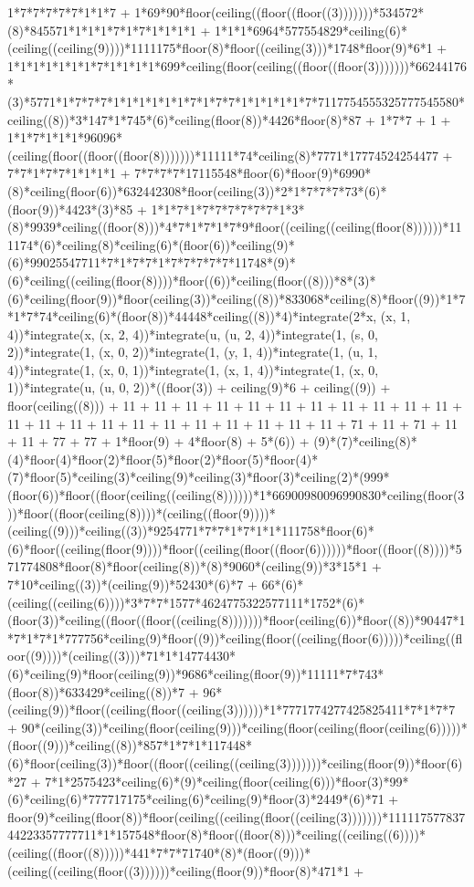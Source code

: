 1*7*7*7*7*7*1*1*7 + 1*69*90*floor(ceiling((floor((floor((3)))))))*534572*(8)*845571*1*1*1*7*1*7*1*1*1*1 + 1*1*1*6964*577554829*ceiling(6)*(ceiling((ceiling(9))))*1111175*floor(8)*floor((ceiling(3)))*1748*floor(9)*6*1 + 1*1*1*1*1*1*1*7*1*1*1*1*699*ceiling(floor(ceiling((floor((floor(3)))))))*66244176*(3)*5771*1*7*7*7*1*1*1*1*1*1*7*1*7*7*1*1*1*1*1*7*7117754555325777545580*ceiling((8))*3*147*1*745*(6)*ceiling(floor(8))*4426*floor(8)*87 + 1*7*7 + 1 + 1*1*7*1*1*1*96096*(ceiling(floor((floor((floor(8)))))))*11111*74*ceiling(8)*7771*17774524254477 + 7*7*1*7*7*1*1*1*1 + 7*7*7*7*17115548*floor(6)*floor(9)*6990*(8)*ceiling(floor(6))*632442308*floor(ceiling(3))*2*1*7*7*7*73*(6)*(floor(9))*4423*(3)*85 + 1*1*7*1*7*7*7*7*7*7*1*3*(8)*9939*ceiling((floor(8)))*4*7*1*7*1*7*9*floor((ceiling((ceiling(floor(8))))))*111174*(6)*ceiling(8)*ceiling(6)*(floor(6))*ceiling(9)*(6)*99025547711*7*1*7*7*1*7*7*7*7*7*11748*(9)*(6)*ceiling((ceiling(floor(8))))*floor((6))*ceiling(floor((8)))*8*(3)*(6)*ceiling(floor(9))*floor(ceiling(3))*ceiling((8))*833068*ceiling(8)*floor((9))*1*7*1*7*74*ceiling(6)*(floor(8))*44448*ceiling((8))*4)*integrate(2*x, (x, 1, 4))*integrate(x, (x, 2, 4))*integrate(u, (u, 2, 4))*integrate(1, (s, 0, 2))*integrate(1, (x, 0, 2))*integrate(1, (y, 1, 4))*integrate(1, (u, 1, 4))*integrate(1, (x, 0, 1))*integrate(1, (x, 1, 4))*integrate(1, (x, 0, 1))*integrate(u, (u, 0, 2))*((floor(3)) + ceiling(9)*6 + ceiling((9)) + floor(ceiling((8))) + 11 + 11 + 11 + 11 + 11 + 11 + 11 + 11 + 11 + 11 + 11 + 11 + 11 + 11 + 11 + 11 + 11 + 11 + 11 + 11 + 11 + 11 + 71 + 11 + 71 + 11 + 11 + 77 + 77 + 1*floor(9) + 4*floor(8) + 5*(6)) + (9)*(7)*ceiling(8)*(4)*floor(4)*floor(2)*floor(5)*floor(2)*floor(5)*floor(4)*(7)*floor(5)*ceiling(3)*ceiling(9)*ceiling(3)*floor(3)*ceiling(2)*(999*(floor(6))*floor((floor(ceiling((ceiling(8))))))*1*66900980096990830*ceiling(floor(3))*floor((floor(ceiling(8))))*(ceiling((floor(9))))*(ceiling((9)))*ceiling((3))*9254771*7*7*1*7*1*1*111758*floor(6)*(6)*floor((ceiling(floor(9))))*floor((ceiling(floor((floor(6))))))*floor((floor((8))))*571774808*floor(8)*floor(ceiling(8))*(8)*9060*(ceiling(9))*3*15*1 + 7*10*ceiling((3))*(ceiling(9))*52430*(6)*7 + 66*(6)*(ceiling((ceiling(6))))*3*7*7*1577*4624775322577111*1752*(6)*(floor(3))*ceiling((floor((floor((ceiling(8)))))))*floor(ceiling(6))*floor((8))*90447*1*7*1*7*1*777756*ceiling(9)*floor((9))*ceiling(floor((ceiling(floor(6)))))*ceiling((floor((9))))*(ceiling((3)))*71*1*14774430*(6)*ceiling(9)*floor(ceiling(9))*9686*ceiling(floor(9))*11111*7*743*(floor(8))*633429*ceiling((8))*7 + 96*(ceiling(9))*floor((ceiling(floor((ceiling(3))))))*1*7771774277425825411*7*1*7*7 + 90*(ceiling(3))*ceiling(floor(ceiling(9)))*ceiling(floor(ceiling(floor(ceiling(6)))))*(floor((9)))*ceiling((8))*857*1*7*1*117448*(6)*floor(ceiling(3))*floor((floor((ceiling((ceiling(3)))))))*ceiling(floor(9))*floor(6)*27 + 7*1*2575423*ceiling(6)*(9)*ceiling(floor(ceiling(6)))*floor(3)*99*(6)*ceiling(6)*777717175*ceiling(6)*ceiling(9)*floor(3)*2449*(6)*71 + floor(9)*ceiling(floor(8))*floor(ceiling((ceiling(floor((ceiling(3)))))))*11111757783744223357777711*1*157548*floor(8)*floor((floor(8)))*ceiling((ceiling((6))))*(ceiling((floor((8)))))*441*7*7*71740*(8)*(floor((9)))*(ceiling((ceiling(floor((3))))))*ceiling(floor(9))*floor(8)*471*1 + 